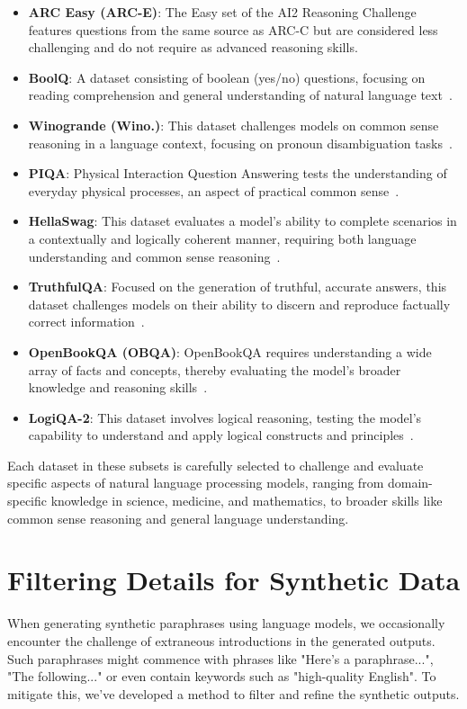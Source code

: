 \begin{itemize}
\item \textbf{ARC Easy (ARC-E)}: The Easy set of the AI2 Reasoning Challenge~\citep{allenai:arc} features questions from the same source as ARC-C but are considered less challenging and do not require as advanced reasoning skills.
\item \textbf{BoolQ}: A dataset consisting of boolean (yes/no) questions, focusing on reading comprehension and general understanding of natural language text~\citep{clark-etal-2019-boolq}.
\item \textbf{Winogrande (Wino.)}: This dataset challenges models on common sense reasoning in a language context, focusing on pronoun disambiguation tasks~\citep{ai2:winogrande}.
\item \textbf{PIQA}: Physical Interaction Question Answering tests the understanding of everyday physical processes, an aspect of practical common sense~\citep{Bisk2020}.
\item \textbf{HellaSwag}: This dataset evaluates a model's ability to complete scenarios in a contextually and logically coherent manner, requiring both language understanding and common sense reasoning~\citep{zellers2019hellaswag}.
\item \textbf{TruthfulQA}: Focused on the generation of truthful, accurate answers, this dataset challenges models on their ability to discern and reproduce factually correct information~\citep{lin2021truthfulqa}.
\item \textbf{OpenBookQA (OBQA)}: OpenBookQA requires understanding a wide array of facts and concepts, thereby evaluating the model's broader knowledge and reasoning skills~\citep{OpenBookQA2018}.
\item \textbf{LogiQA-2}: This dataset involves logical reasoning, testing the model's capability to understand and apply logical constructs and principles~\citep{logiqa2}.
\end{itemize}

Each dataset in these subsets is carefully selected to challenge and evaluate specific aspects of natural language processing models, ranging from domain-specific knowledge in science, medicine, and mathematics, to broader skills like common sense reasoning and general language understanding.



\section{Filtering Details for Synthetic Data}
When generating synthetic paraphrases using language models, we occasionally encounter the challenge of extraneous introductions in the generated outputs. Such paraphrases might commence with phrases like "Here's a paraphrase...", "The following..." or even contain keywords such as "high-quality English". To mitigate this, we've developed a method to filter and refine the synthetic outputs.

